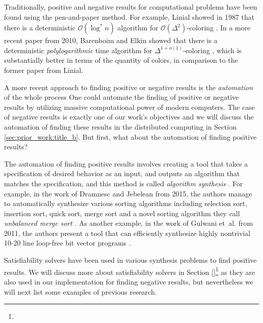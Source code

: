 Traditionally, positive and negative results for computational problems have been found using the pen-and-paper method.
For example, Linial showed in 1987 that there is a deterministic \(\mathcal{O}(\log^* n)\) algorithm for \(\mathcal{O}(\Delta^2)\)-coloring \cite{DBLP:conf/focs/Linial87}.
In a more recent paper from 2010, Barenboim and Elkin showed that there is a deterministic \emph{polylogarithmic} time algorithm for \(\Delta^{1 + o(1)}\)-coloring \cite{DBLP:conf/podc/BarenboimE10}, which is substantially better in terms of the quantity of colors, in comparison to the former paper \cite{DBLP:conf/focs/Linial87} from Linial.

A more recent approach to finding positive or negative results is the \emph{automation} of the whole process
One could automate the finding of positive or negative results by utilizing massive computational power of modern computers.
The case of negative results is exactly one of our work's objectives and we will discuss the automation of finding these results in the distributed computing in Section \ref{sec:prior_work:title_b}.
But first, what about the automation of finding positive results?

The automation of finding positive results involves creating a tool that takes a specification of desired behavior as an input, and outputs an algorithm that matches the specification, and this method is called \emph{algorithm synthesis} \cite{DBLP:phd/basesearch/Rybicki16}.
For example, in the work of Dramnesc and Jebelean from 2015, the authors manage to automatically synthesize various sorting algorithms including selection sort, insertion sort, quick sort, merge sort and a novel sorting algorithm they call \emph{unbalanced merge sort} \cite{DBLP:journals/jsc/DramnescJ15}.
As another example, in the work of Gulwani et~al. from 2011, the authors present a tool that can efficiently synthesize highly nontrivial 10-20 line loop-free bit vector programs \cite{DBLP:conf/pldi/GulwaniJTV11}.

Satisfiability solvers have been used in various synthesis problems to find positive results.
We will discuss more about satisfiability solvers in Section \ref{}\footnote{} as they are also used in our implementation for finding negative results, but nevertheless we will next list some examples of previous research.




